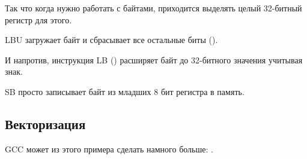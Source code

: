 Так что когда нужно работать с байтами, приходится выделять целый 32-битный регистр для этого.

LBU загружает байт и сбрасывает все остальные биты ().

И напротив, инструкция LB () расширяет байт до 32-битного значения учитывая знак.

SB просто записывает байт из младших 8 бит регистра в память.

\fi

\subsection{Векторизация}

\Optimizing GCC может из этого примера сделать намного больше: 
.
